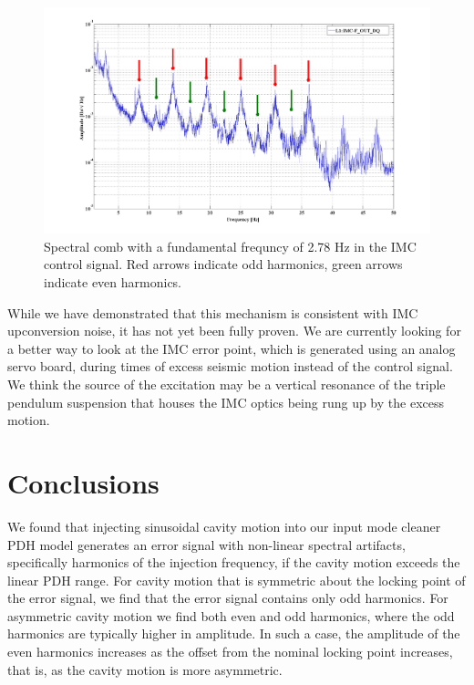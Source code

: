\begin{figure}[h!]
\includegraphics[height=0.6\textwidth]{figures/IMCUpconversion/upconversion_comb.png}
\caption[Spectral comb in IMC control signal]{Spectral comb with a fundamental frequncy of 2.78 Hz in the IMC control signal. Red arrows indicate odd harmonics, green arrows indicate even harmonics. }
\end{figure}

While we have demonstrated that this mechanism is consistent with IMC upconversion noise, 
it has not yet been fully proven. We are currently looking for a better way to look at 
the IMC error point, which is generated using an analog servo board, during times of 
excess seismic motion instead of the control signal. 
We think the source of the excitation may be a vertical resonance of the triple 
pendulum suspension that houses the IMC optics being rung up by the excess motion.

\section{Conclusions}

We found that injecting sinusoidal cavity motion into our input mode cleaner PDH model 
generates an error signal with non-linear spectral artifacts, specifically harmonics 
of the injection frequency, if the cavity motion exceeds the linear PDH range. 
For cavity motion that is symmetric about the locking point of the error signal, 
we find that the error signal contains only odd harmonics. For asymmetric cavity 
motion we find both even and odd harmonics, where the odd harmonics are typically higher 
in amplitude. In such a case, the amplitude of the even harmonics increases as the 
offset from the nominal locking point increases, that is, as the cavity motion is 
more asymmetric.

